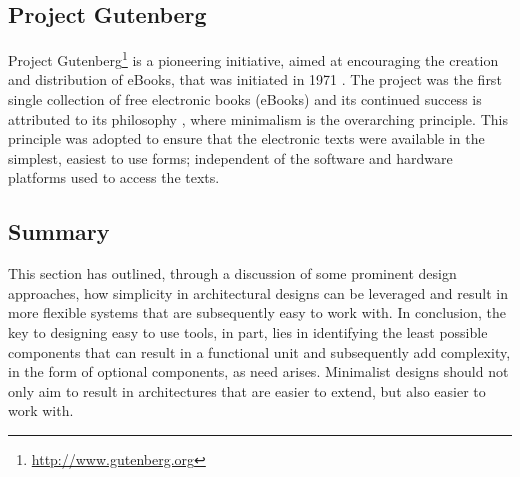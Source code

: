\subsection{Project Gutenberg}
\label{sec:background:related-work:project-gutenberg}

Project Gutenberg\footnote{\url{http://www.gutenberg.org}} is a pioneering initiative, aimed at encouraging the creation and distribution of eBooks, that was initiated in 1971 \citep{GutenbergAbout}. The project was the first single collection of free electronic books (eBooks) and its continued success is attributed to its philosophy \citep{Hart1992}, where minimalism is the overarching principle. This principle was adopted to ensure that the electronic texts were available in the simplest, easiest to use forms; independent of the software and hardware platforms used to access the texts.

\subsection{Summary}
\label{sec:background:simple-architectures:summary}

This section has outlined, through a discussion of some prominent design approaches, how simplicity in architectural designs can be leveraged and result in more flexible systems that are subsequently easy to work with. In conclusion, the key to designing easy to use tools, in part, lies in identifying the least possible components that can result in a functional unit and subsequently add complexity, in the form of optional components, as need arises. Minimalist designs should not only aim to result in architectures that are easier to extend, but also easier to work with.